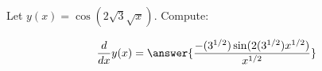 \documentclass{ximera}
\begin{document}
\begin{exercise}
Let $y(x) = \cos \left(2 \sqrt{3} \sqrt{x}\right)$. Compute:

\[
\dd{x}y(x)
=\answer{\frac{-(3^{1/2})\sin(2 (3^{1/2}) x^{1/2})}{x^{1/2} }}
\]
\end{exercise}
\end{document}

